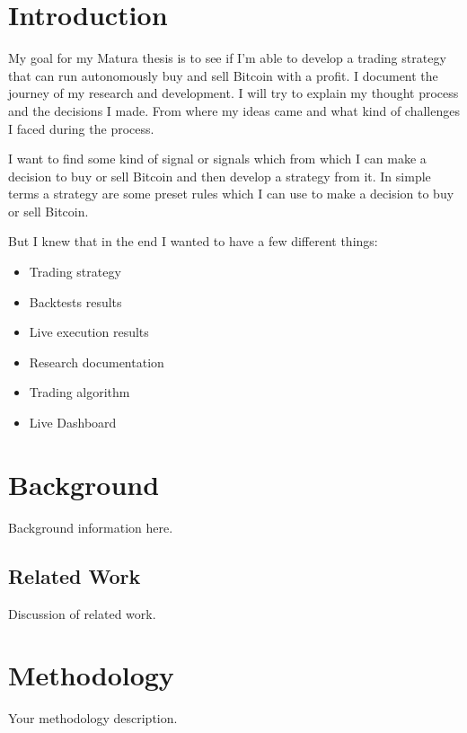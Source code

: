 \documentclass[12pt]{article}
\begin{document}
\newpage
\section{Introduction}
My goal for my Matura thesis is to see if I'm able to develop a trading strategy that can run autonomously buy and sell Bitcoin with a profit. 
I document the journey of my research and development. I will try to explain my thought process and the decisions I made. From where my ideas came and what kind of challenges I faced during the process.

I want to find some kind of signal or signals which from which I can make a decision to buy or sell Bitcoin and then develop a strategy from it. In simple terms a strategy are some preset rules which I can use to make a decision to buy or sell Bitcoin.

But I knew that in the end I wanted to have a few different things:

\begin{itemize}
    \item Trading strategy
    \item Backtests results
    \item Live execution results
    \item Research documentation
    \item Trading algorithm
    \item Live Dashboard

\end{itemize}











\newpage

\section{Background}
Background information here.



\newpage
\subsection{Related Work}
Discussion of related work.


\newpage
\section{Methodology}
Your methodology description.



\newpage
\end{document}
